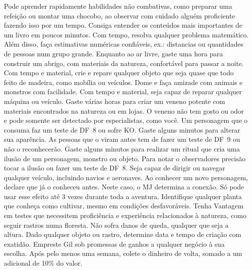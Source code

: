 \vfill
{}
{
	Pode aprender rapidamente habilidades não combativas, como preparar uma refeição ou montar uma chocobo, ao observar com cuidado alguém proficiente fazendo isso por um tempo. 
}
\newpage
{}
{
	Consiga entender os conteúdos mais importantes de um livro em poucos minutos.
}
\vfill
{}
{
	Com tempo, resolva qualquer problema matemático.
	Além disso, faça estimativas numéricas confiáveis, ex.: distancias ou quantidades de pessoas num grupo grande.
}
\vfill
{}
{
	Enquanto ao ar livre, gaste uma hora para construir um abrigo, com materiais da natureza, confortável para passar a noite.
}	
\vfill
{}
{
	Com tempo e material, crie e repare qualquer objeto que seja quase que todo feito de madeira, como mobília ou veículos. 
}
\vfill
{}
{
	Dome e faça amizade com animais e monstros com facilidade.
}
\vfill
{}
{
	Com tempo e material, seja capaz de reparar qualquer máquina ou veículo. 
}
\vfill
{}
{
	Gaste várias horas para criar um veneno potente com materiais encontrados na natureza ou em lojas.
	O veneno não tem gosto ou odor e pode somente ser detectado por especialistas, como você.
	Um personagem que o consuma faz um teste de DF~8 ou sofre KO. 
}
\vfill
{}
{
	Gaste alguns minutos para alterar sua aparência.
	As pessoas que o viram antes tem de fazer um teste de DF~9 ou não o reconhecerão.
}
\vfill
{}
{
	Gaste alguns minutos para realizar um ritual que cria uma ilusão de um personagem, monstro ou objeto.
	Para notar o observadores precisão tocar a ilusão ou fazer um teste de DF~8.
}
\vfill
{}
{
	Seja capaz de dirigir ou navegar qualquer veículo, incluindo navios e aeronaves.
}
\vfill
{}
{
	Ao conhecer um novo personagem, declare que já o conheceu antes.
	Neste caso, o MJ determina a conexão.
	Só pode usar esse efeito até 3 vezes durante toda a aventura.
}
\vfill
{} 
{
	Identifique qualquer planta que conheça como cultivar, mesmo em condições desfavoráveis.
}
\vfill
{}
{
	Tenha Vantagem em testes que necessitem proficiência e experiência relacionados à natureza, como seguir rastros numa floresta.
}
%
\newpage
%
{
	Não sofra danos de queda, qualquer que seja a altura.
}
\vfill
{} 
{
	Dado qualquer objeto ou rastro, determine data e tempo de criação com exatidão.
}
\vfill
{}
{
	Empreste Gil sob promessas de ganhos a qualquer negócio à sua escolha.
	Após pelo menos uma semana, colete o dinheiro de volta, somado a um adicional de 10\% do valor.
}
